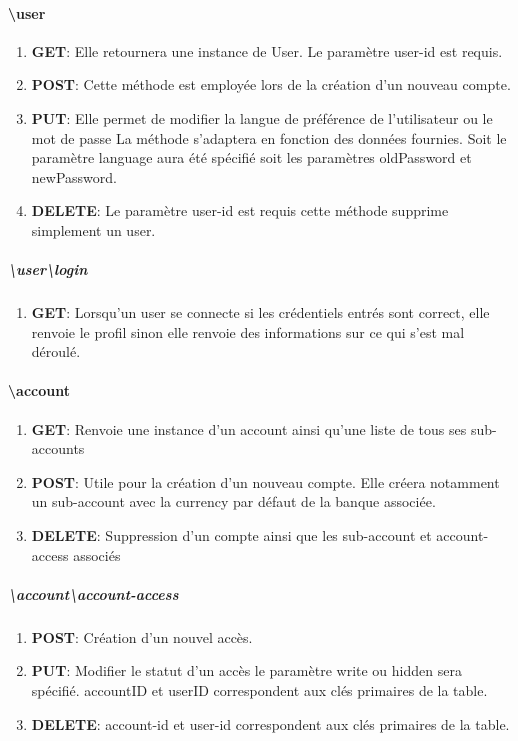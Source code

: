 \documentclass{article}
\begin{document}
\paragraph{\textbackslash user}
    \begin{enumerate}
        \item \textbf{GET}: Elle retournera une instance de User. Le paramètre user-id est requis.
        \item \textbf{POST}: Cette méthode est employée lors de la création d'un nouveau compte.
        \item \textbf{PUT}: Elle permet de modifier la langue de préférence de l'utilisateur ou le mot de passe
                            La méthode s'adaptera en fonction des données fournies. Soit le paramètre language aura été spécifié
                            soit les paramètres oldPassword et newPassword.
        \item \textbf{DELETE}: Le paramètre user-id est requis cette méthode supprime simplement un user.
    \end{enumerate}
    \subparagraph{\textbackslash user\textbackslash login}
        \begin{enumerate}
            \item \textbf{GET}: Lorsqu'un user se connecte si les crédentiels entrés sont correct, elle renvoie
                                le profil sinon elle renvoie des informations sur ce qui s'est mal déroulé.
        \end{enumerate}


\paragraph{\textbackslash account}
    \begin{enumerate}
        \item \textbf{GET}: Renvoie une instance d'un account ainsi qu'une liste de tous ses sub-accounts
        \item \textbf{POST}: Utile pour la création d'un nouveau compte. Elle créera notamment un sub-account
                                avec la currency par défaut de la banque associée.
        \item \textbf{DELETE}: Suppression d'un compte ainsi que les sub-account et account-access associés
    \end{enumerate}
    \subparagraph{\textbackslash account\textbackslash account-access}
        \begin{enumerate}
            \item \textbf{POST}: Création d'un nouvel accès.
            \item \textbf{PUT}: Modifier le statut d'un accès le paramètre write ou hidden sera spécifié. accountID
                                et userID correspondent aux clés primaires de la table.
            \item \textbf{DELETE}: account-id et user-id correspondent aux clés primaires de la table.
        \end{enumerate}
\end{document}
